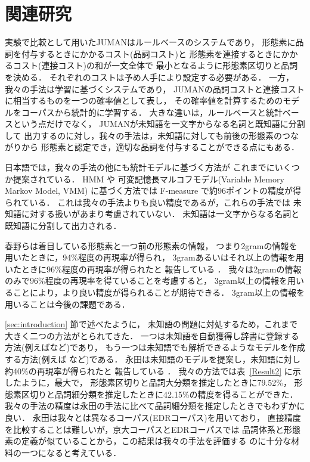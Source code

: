 \section{関連研究}
\label{sec:related_works}

実験で比較として用いたJUMANはルールベースのシステムであり，
形態素に品詞を付与するときにかかるコスト(品詞コスト)と
形態素を連接するときにかかるコスト(連接コスト)の和が一文全体で
最小となるように形態素区切りと品詞を決める．
それぞれのコストは予め人手により設定する必要がある．
一方，我々の手法は学習に基づくシステムであり，
JUMANの品詞コストと連接コストに相当するものを一つの確率値として表し，
その確率値を計算するためのモデルをコーパスから統計的に学習する．
大きな違いは，ルールベースと統計ベースという点だけでなく，
JUMANが未知語を一文字からなる名詞と既知語に分割して
出力するのに対し，我々の手法は，未知語に対しても前後の形態素のつながりから
形態素と認定でき，適切な品詞を付与することができる点にもある．

日本語では，我々の手法の他にも統計モデルに基づく方法が
これまでにいくつか提案されている．
HMM \cite{Takeuchi:97} や
可変記憶長マルコフモデル(Variable Memory Markov Model, VMM) 
\cite{Haruno:acl97,Kitauchi:99} に基づく方法では
F-measure で約96ポイントの精度が得られている．
これは我々の手法よりも良い精度であるが，これらの手法では
未知語に対する扱いがあまり考慮されていない．
未知語は一文字からなる名詞と既知語に分割して出力される．

春野らは着目している形態素と一つ前の形態素の情報，
つまり2gramの情報を用いたときに，94\%程度の再現率が得られ，
3gramあるいはそれ以上の情報を用いたときに96\%程度の再現率が得られたと
報告している \cite{Haruno:acl97}．
我々は2gramの情報のみで96\%程度の再現率を得ていることを考慮すると，
3gram以上の情報を用いることにより，より良い精度が得られることが期待できる．
3gram以上の情報を用いることは今後の課題である．

\ref{sec:introduction} 節で述べたように，
未知語の問題に対処するため，これまで大きく二つの方法がとられてきた．
一つは未知語を自動獲得し辞書に登録する方法(例えば\cite{Mori:96}など)であり，
もう一つは未知語でも解析できるようなモデルを作成する方法(例えば
\cite{Kashioka:97,Nagata:99}など)である．
永田は未知語のモデルを提案し，未知語に対し約40\%の再現率が得られたと
報告している \cite{Nagata:99}．
我々の方法では表~\ref{Result2} に示したように，最大で，
形態素区切りと品詞大分類を推定したときに79.52\%，
形態素区切りと品詞細分類を推定したときに42.15\%の精度を得ることができた．
我々の手法の精度は永田の手法に比べて品詞細分類を推定したときでもわずかに良い．
永田は我々とは異なるコーパス(EDRコーパス)を用いており，
直接精度を比較することは難しいが，京大コーパスとEDRコーパスでは
品詞体系と形態素の定義が似ていることから，この結果は我々の手法を評価する
のに十分な材料の一つになると考えている．

